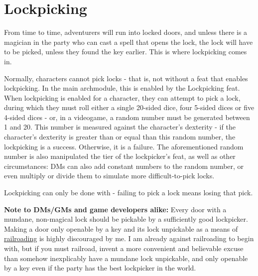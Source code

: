 \section{Lockpicking}
From time to time, adventurers will run into locked doors, and unless there is a magician in the party who can cast a spell that opens the lock, the lock will have to be picked, unless they found the key earlier. This is where lockpicking comes in.

Normally, characters cannot pick locks - that is, not without a feat that enables lockpicking. In the main archmodule, this is enabled by the Lockpicking feat. When lockpicking is enabled for a character, they can attempt to pick a lock, during which they must roll either a single 20-sided dice, four 5-sided dices or five 4-sided dices - or, in a videogame, a random number must be generated between 1 and 20. This number is measured against the character's dexterity - if the character's dexterity is greater than or equal than this random number, the lockpicking is a success. Otherwise, it is a failure. The aforementioned random number is also manipulated the tier of the lockpicker's feat, as well as other circumstances: DMs can also add constant numbers to  the random number, or even multiply or divide them to simulate more difficult-to-pick locks.

Lockpicking can only be done with  - failing to pick a lock means losing that pick.

\small{\textbf{Note to DMs/GMs and game developers alike:} Every door with a mundane, non-magical lock should be pickable by a sufficiently good lockpicker. Making a door only openable by a key and its lock unpickable as a means of \href{https://tvtropes.org/pmwiki/pmwiki.php/Main/Railroading}{railroading} is highly discouraged by me. I am already against railroading to begin with, but if you must railroad, invent a more convenient and believable excuse than somehow inexplicably have a mundane lock unpickable, and only openable by a key even if the party has the best lockpicker in the world.}
